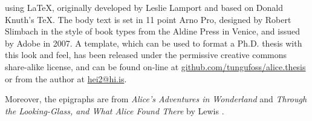  using \LaTeX, originally developed by 
Leslie Lamport and based on Donald Knuth's \TeX. The body text is set in 11 
point Arno Pro, designed by Robert Slimbach in the style of book types from the 
Aldine Press in Venice, and issued by Adobe in 2007. 
A template, which can be used to format a Ph.D. thesis with this look and feel, 
has been released under the permissive creative commons share-alike license, 
and can be found on-line at 
\href{https://github.com/tungufoss/alice.thesis}{github.com/tungufoss/alice.thesis}
or from the author at \href{mailto:hei2@hi.is}{hei2@hi.is}. 

Moreover, the epigraphs are from \emph{Alice's Adventures in Wonderland} 
\citeyearpar{alice} and \emph{Through the Looking-Glass, and What Alice Found 
There} \citeyearpar{lookingglass} by Lewis \citeauthor{alice}.